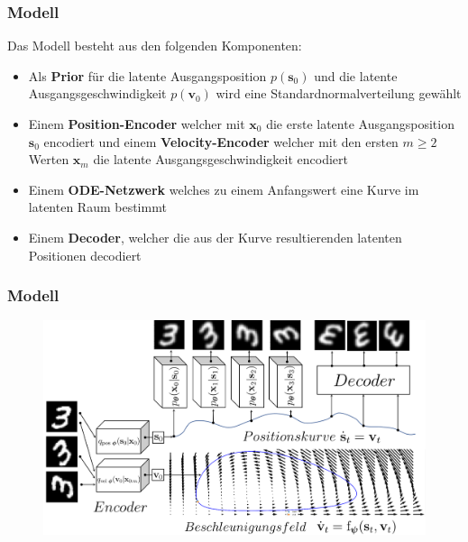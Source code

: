 \begin{frame}
\frametitle{Modell}
Das Modell besteht aus den folgenden Komponenten:
\begin{itemize}
	\item Als \textbf{Prior} für die latente Ausgangsposition $p(\mathbf{s}_{0})$ und die latente Ausgangsgeschwindigkeit $p(\mathbf{v}_{0})$ wird eine Standardnormalverteilung gewählt
	\item Einem \textbf{Position-Encoder} welcher mit $\mathbf{x}_{0}$ die erste latente Ausgangsposition $\mathbf{s}_{0}$ encodiert und einem \textbf{Velocity-Encoder} welcher mit den ersten $m\geq2$ Werten $\mathbf{x}_{m}$ die latente Ausgangsgeschwindigkeit encodiert\\
    \item Einem \textbf{ODE-Netzwerk} welches zu einem Anfangswert eine Kurve im latenten Raum bestimmt\\
    \item Einem \textbf{Decoder}, welcher die aus der Kurve resultierenden latenten Positionen decodiert
\end{itemize}
\end{frame}




\begin{frame}
    \frametitle{Modell}
    	\begin{figure}[h!]
    	\centering
    	\includegraphics[scale=0.36]{Bilder/ODE2VAE_ODE_Net}
    \end{figure}
\end{frame}




